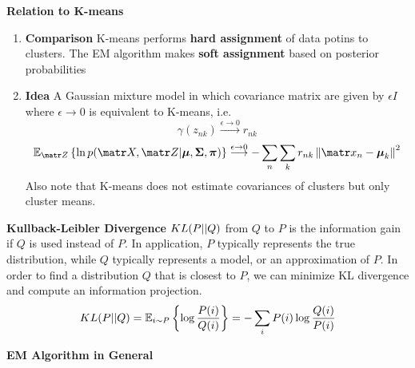 \documentclass[11pt]{article}
\begin{document}
\begin{defn*}
    \textbf{Relation to K-means} \\
    \begin{enumerate}
        \item \textbf{Comparison} K-means performs \textbf{hard assignment} of data potins to clusters. The EM algorithm makes \textbf{soft assignment} based on posterior probabilities
        \item \textbf{Idea} A Gaussian mixture model in which covariance matrix are given by $\epsilon I$ where $\epsilon \rightarrow 0$ is equivalent to K-means, i.e. 
        \[
            \gamma(z_{nk}) \overset{\epsilon \rightarrow 0}{\longrightarrow} r_{nk}
        \]
        \[
            \E[\bZ]{\ln p(\bX, \bZ | \bmu, \bSigma, \bpi)} \overset{\epsilon\rightarrow 0}{\longrightarrow}
            - \sum_n \sum_k r_{nk} \norm{\bx_n - \bmu_k}^2
        \]
        Also note that K-means does not estimate covariances of clusters but only cluster means. 
    \end{enumerate}
\end{defn*}





\begin{defn*}
    \textbf{Kullback-Leibler Divergence} $\kl{P}{Q}$ from $Q$ to $P$ is the information gain if $Q$ is used instead of $P$. In application, $P$ typically represents the true distribution, while $Q$ typically represents a model, or an approximation of $P$. In order to find a distribution $Q$ that is closest to $P$, we can minimize KL divergence and compute an information projection.
    \[
        \kl{P}{Q} = \E[i \sim P]{\log \frac{P(i)}{Q(i)}} =  -\sum_i P(i) \log \frac{Q(i)}{P(i)}
    \]
\end{defn*}

\textbf{EM Algorithm in General}
\end{document}
